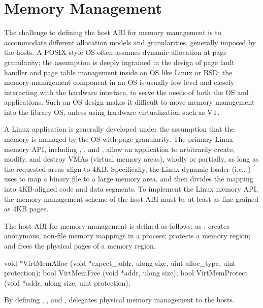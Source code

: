 \section{Memory Management}
\label{sec:abi:memory}


The challenge to defining the host ABI for memory management
is to accommodate different allocation models and granularities, generally imposed by the hosts.
A POSIX-style OS often assumes dynamic allocation at page granularity;
the assumption is deeply ingrained in the design of page fault handler and page table management
inside an OS like Linux or BSD;
the memory-management component in an OS
is usually low-level and closely interacting with the hardware interface,
to serve the needs of both the OS and applications.
Such an OS design makes it difficult to move memory management
into the library OS, unless using hardware virtualization such as VT.



A Linux application 
is generally developed under the assumption that the memory is managed by the OS
with page granularity.
The primary Linux memory API,
including , , and ,
allow an application
to arbitrarily create, modify, and destroy VMAs (virtual memory areas),
wholly or partially,
as long as the requested areas align to
4KB.
Specifically, the Linux dynamic loader (i.e., ) %
uses  to map a binary file to a large memory area,
and then divides the mapping into 4KB-aligned code and data segments.
To implement the Linux memory API,
the memory management scheme of the host ABI
must be at least as fine-grained as 4KB pages.


The host ABI for memory management is defined as follows:
as ,
 creates anonymous, non-file memory mappings in a process;
 protects a memory region;
and  frees the physical pages of a memory region.




\begin{paldef}
void *VirtMemAlloc   (void *expect_addr, ulong size,
                      uint alloc_type, uint protection);
bool  VirtMemFree    (void *addr, ulong size);
bool  VirtMemProtect (void *addr, ulong size,
                      uint protection);
\end{paldef}


By defining , , and , \graphene{}
delegates physical memory management to the hosts.




